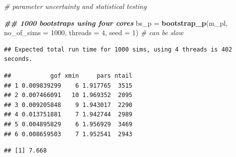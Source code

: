 \documentclass[
]{book}
\newenvironment{Shaded}{\begin{snugshade}}{\end{snugshade}}
\newcommand{\AttributeTok}[1]{\textcolor[rgb]{0.13,0.29,0.53}{#1}}
\newcommand{\CommentTok}[1]{\textcolor[rgb]{0.56,0.35,0.01}{\textit{#1}}}
\newcommand{\DecValTok}[1]{\textcolor[rgb]{0.00,0.00,0.81}{#1}}
\newcommand{\DocumentationTok}[1]{\textcolor[rgb]{0.56,0.35,0.01}{\textbf{\textit{#1}}}}
\newcommand{\FunctionTok}[1]{\textcolor[rgb]{0.13,0.29,0.53}{\textbf{#1}}}
\newcommand{\NormalTok}[1]{#1}
\newcommand{\OtherTok}[1]{\textcolor[rgb]{0.56,0.35,0.01}{#1}}
\newcommand{\SpecialCharTok}[1]{\textcolor[rgb]{0.81,0.36,0.00}{\textbf{#1}}}
\begin{document}
\begin{Shaded}
\begin{Highlighting}[]
\CommentTok{\# parameter uncertainty and statistical testing }

\DocumentationTok{\#\# 1000 bootstraps using four cores}
\NormalTok{bs\_p }\OtherTok{=} \FunctionTok{bootstrap\_p}\NormalTok{(m\_pl, }\AttributeTok{no\_of\_sims =} \DecValTok{1000}\NormalTok{, }\AttributeTok{threads =} \DecValTok{4}\NormalTok{, }\AttributeTok{seed =} \DecValTok{1}\NormalTok{) }\CommentTok{\# can be slow}
\end{Highlighting}
\end{Shaded}

\begin{verbatim}
## Expected total run time for 1000 sims, using 4 threads is 402 seconds.
\end{verbatim}

\begin{Shaded}
\end{Shaded}

\begin{verbatim}
##           gof xmin     pars ntail
## 1 0.009839299    6 1.917765  3515
## 2 0.007466091   10 1.969352  2095
## 3 0.009205848    9 1.943017  2290
## 4 0.013751881    7 1.942744  2989
## 5 0.004895829    6 1.956929  3469
## 6 0.008659503    7 1.952541  2943
\end{verbatim}

\begin{Shaded}
\end{Shaded}

\begin{verbatim}
## [1] 7.668
\end{verbatim}

\begin{Shaded}
\end{Shaded}
\end{document}
